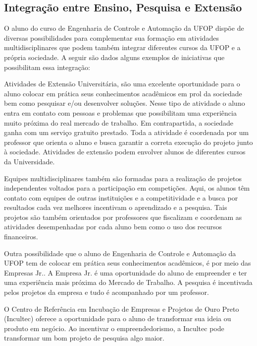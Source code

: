 \subsection*{Integração entre Ensino, Pesquisa e Extensão}

O aluno do curso de Engenharia de Controle e Automação da UFOP dispõe de diversas possibilidades para complementar sua formação em atividades multidisciplinares que podem também integrar diferentes cursos da UFOP e a própria sociedade. A seguir são dados alguns exemplos de iniciativas que possibilitam essa integração:

Atividades de Extensão Universitária, são uma excelente oportunidade para o aluno colocar em prática seus conhecimentos acadêmicos em prol da sociedade bem como pesquisar e/ou desenvolver soluções. Nesse tipo de atividade o aluno entra em contato com pessoas e problemas que possibilitam uma experiência muito próxima do real mercado de trabalho. Em contrapartida, a sociedade ganha com um serviço gratuito prestado. Toda a atividade é coordenada por um professor que orienta o aluno e busca garantir a correta execução do projeto junto à sociedade. Atividades de extensão podem envolver alunos de diferentes cursos da Universidade.

Equipes multidisciplinares também são formadas para a realização de projetos independentes voltados para a participação em competições. Aqui, os alunos têm contato com equipes de outras instituições e a competitividade e a busca por resultados cada vez melhores incentivam o aprendizado e a pesquisa. Tais projetos são também orientados por professores que fiscalizam e coordenam as atividades desempenhadas por cada aluno bem como o uso dos recursos financeiros.

Outra possibilidade que o aluno de Engenharia de Controle e Automação da UFOP tem de colocar em prática seus conhecimentos acadêmicos, é por meio das Empresas Jr.. A Empresa Jr. é uma oportunidade do aluno de empreender e ter uma experiência mais próxima do Mercado de Trabalho. A pesquisa é incentivada pelos projetos da empresa e tudo é acompanhado por um professor.

O Centro de Referência em Incubação de Empresas e Projetos de Ouro Preto (Incultec) oferece a oportunidade para o aluno de transformar sua ideia ou produto em negócio. Ao incentivar o empreendedorismo, a Incultec pode transformar um bom projeto de pesquisa algo maior. 